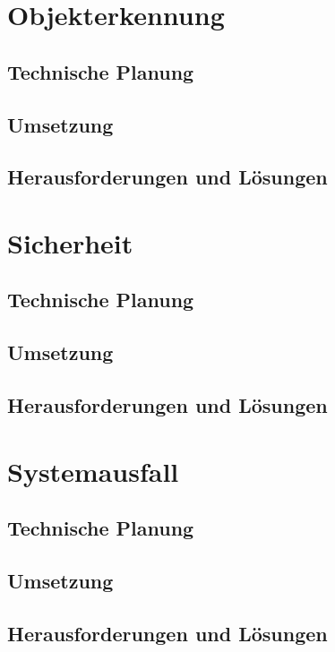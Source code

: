 \section{Objekterkennung}

  \subsection{Technische Planung}

  \subsection{Umsetzung}

  \subsection{Herausforderungen und Lösungen}

\section{Sicherheit}

  \subsection{Technische Planung}

  \subsection{Umsetzung}

  \subsection{Herausforderungen und Lösungen}

\section{Systemausfall}

  \subsection{Technische Planung}

  \subsection{Umsetzung}

  \subsection{Herausforderungen und Lösungen}
